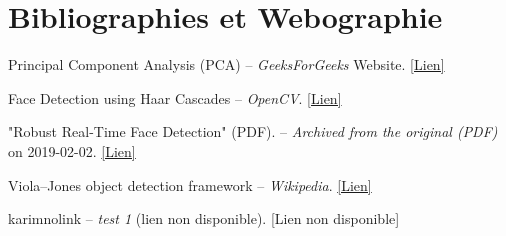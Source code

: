 \documentclass[a4paper,12pt]{report} %
\begin{document}
\chapter{Bibliographies et Webographie}
\begin{thebibliography}{9}

Principal Component Analysis (PCA) – \textit{GeeksForGeeks} Website. 
\href{https://www.geeksforgeeks.org/principal-component-analysis-pca/}{[Lien]} 

Face Detection using Haar Cascades – \textit{OpenCV}. 
\href{https://docs.opencv.org/3.0-beta/doc/py_tutorials/py_objdetect/py_face_detection/py_face_detection.html}{[Lien]} 

"Robust Real-Time Face Detection" (PDF). – \textit{Archived from the original (PDF)} on 2019-02-02.
\href{https://web.archive.org/web/20190202042433/http://www.vision.caltech.edu/html-files/EE148-2005-Spring/pprs/viola04ijcv.pdf}{[Lien]} 

Viola–Jones object detection framework – \textit{Wikipedia}.
\href{https://en.wikipedia.org/wiki/Viola–Jones_object_detection_framework}{[Lien]} 

karimnolink – \textit{test 1} (lien non disponible).
\alert{[Lien non disponible]}

\end{thebibliography}
\end{document}
